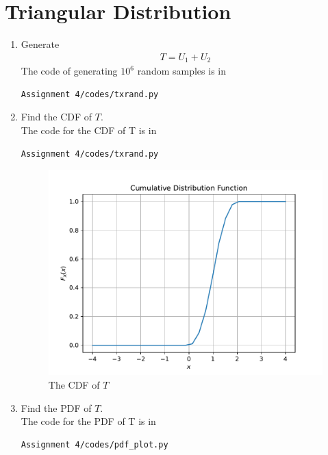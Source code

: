 \documentclass[journal,12pt,twocolumn]{IEEEtran}
\renewcommand\thesection{\arabic{section}}
\begin{document}
\section{Triangular Distribution}
\begin{enumerate}[label=\thesection.\arabic*
,ref=\thesection.\theenumi]
%
\item Generate 
	\begin{align}
		T = U_1+U_2
	\end{align}
\solution
The code of generating $10^6$ random samples is in
\begin{lstlisting}
Assignment 4/codes/txrand.py
\end{lstlisting}
\item Find the CDF of $T$.\\
\solution
The code for the CDF of T is in
\begin{lstlisting}
Assignment 4/codes/txrand.py
\end{lstlisting}
\begin{figure}
\centering
\includegraphics[width=\columnwidth]{./figs/t_cdf}
\caption{The CDF of $T$}
\label{fig:t_cdf}
\end{figure}
\item Find the PDF of $T$.\\
\solution
The code for the PDF of T is in
\begin{lstlisting}
Assignment 4/codes/pdf_plot.py
\end{lstlisting}
\begin{figure}
\centering

\end{figure}
\end{enumerate}
\end{document}
